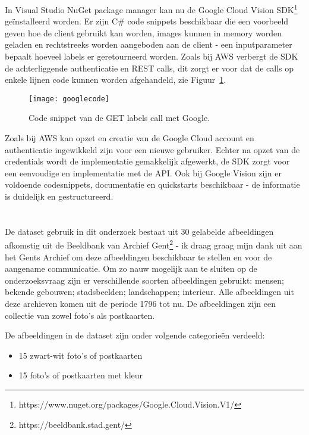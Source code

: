 In Visual Studio NuGet package manager kan nu de Google Cloud Vision SDK\footnote{https://www.nuget.org/packages/Google.Cloud.Vision.V1/} geïnstalleerd worden. Er zijn C\# code snippets beschikbaar die een voorbeeld geven hoe de client gebruikt kan worden, images kunnen in memory worden geladen en rechtstreeks worden aangeboden aan de client - een inputparameter bepaalt hoeveel labels er geretourneerd worden. Zoals bij AWS verbergt de SDK de achterliggende authenticatie en REST calls, dit zorgt er voor dat de calls op enkele lijnen code kunnen worden afgehandeld, zie Figuur~\ref{fig:googlecode}.

\begin{figure}
    \centering
    \texttt{[image: googlecode]}
    \caption{Code snippet van de GET labels call met Google.}
    \label{fig:googlecode}
\end{figure}

Zoals bij AWS kan opzet en creatie van de Google Cloud account en authenticatie ingewikkeld zijn voor een nieuwe gebruiker. Echter na opzet van de credentials wordt de implementatie gemakkelijk afgewerkt, de SDK zorgt voor een eenvoudige en implementatie met de API. Ook bij Google Vision zijn er voldoende codesnippets, documentatie en quickstarts beschikbaar - de informatie is duidelijk en gestructureerd.

\section{}
\label{sec:methodologie-data}
De dataset gebruik in dit onderzoek bestaat uit 30 gelabelde afbeeldingen afkomstig uit de Beeldbank van Archief Gent\footnote{https://beeldbank.stad.gent/} - ik draag graag mijn dank uit aan het Gents Archief om deze afbeeldingen beschikbaar te stellen en voor de aangename communicatie. Om zo nauw mogelijk aan te sluiten op de onderzoeksvraag zijn er verschillende soorten afbeeldingen gebruikt: mensen; bekende gebouwen; stadsbeelden; landschappen; interieur. Alle afbeeldingen uit deze archieven komen uit de periode 1796 tot nu. De afbeeldingen zijn een collectie van zowel foto's als postkaarten.

De afbeeldingen in de dataset zijn onder volgende categorieën verdeeld:
\begin{itemize}
    \item 15 zwart-wit foto's of postkaarten
    \item 15 foto's of postkaarten met kleur
\end{itemize}

